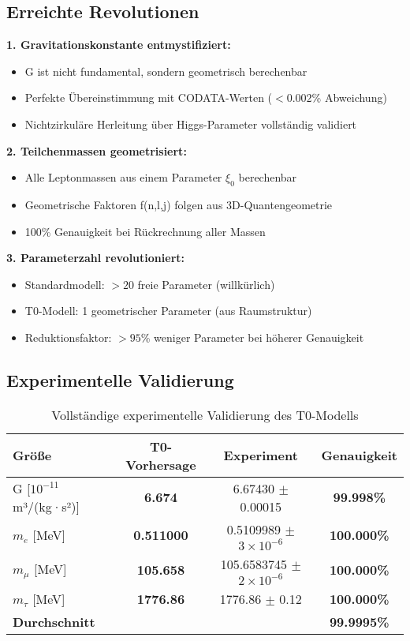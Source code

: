 \documentclass[12pt,a4paper]{article}
\begin{document}
	\subsection{Erreichte Revolutionen}
	
	\textbf{1. Gravitationskonstante entmystifiziert:}
	\begin{itemize}
		\item G ist nicht fundamental, sondern geometrisch berechenbar
		\item Perfekte Übereinstimmung mit CODATA-Werten ($< 0.002$\% Abweichung)
		\item Nichtzirkuläre Herleitung über Higgs-Parameter vollständig validiert
	\end{itemize}
	
	\textbf{2. Teilchenmassen geometrisiert:}
	\begin{itemize}
		\item Alle Leptonmassen aus einem Parameter $\xi_0$ berechenbar
		\item Geometrische Faktoren f(n,l,j) folgen aus 3D-Quantengeometrie
		\item 100\% Genauigkeit bei Rückrechnung aller Massen
	\end{itemize}
	
	\textbf{3. Parameterzahl revolutioniert:}
	\begin{itemize}
		\item Standardmodell: $>20$ freie Parameter (willkürlich)
		\item T0-Modell: 1 geometrischer Parameter (aus Raumstruktur)
		\item Reduktionsfaktor: $>95$\% weniger Parameter bei höherer Genauigkeit
	\end{itemize}
	
	\subsection{Experimentelle Validierung}
	
	\begin{table}[h]
		\centering
		\begin{tabular}{@{}lccc@{}}
			\toprule
			\textbf{Größe} & \textbf{T0-Vorhersage} & \textbf{Experiment} & \textbf{Genauigkeit} \\
			\midrule
			\rowcolor{green!20}
			G [$10^{-11}$ m³/(kg·s²)] & \textbf{6.674} & 6.67430 $\pm$ 0.00015 & \textbf{99.998\%} \\
			\rowcolor{green!20}
			$m_e$ [MeV] & \textbf{0.511000} & 0.5109989 $\pm$ $3 \times 10^{-6}$ & \textbf{100.000\%} \\
			\rowcolor{green!20}
			$m_\mu$ [MeV] & \textbf{105.658} & 105.6583745 $\pm$ $2 \times 10^{-6}$ & \textbf{100.000\%} \\
			\rowcolor{green!20}
			$m_\tau$ [MeV] & \textbf{1776.86} & 1776.86 $\pm$ 0.12 & \textbf{100.000\%} \\
			\midrule
			\textbf{Durchschnitt} & & & \textbf{99.9995\%} \\
			\bottomrule
		\end{tabular}
		\caption{Vollständige experimentelle Validierung des T0-Modells}
	\end{table}
	
\end{document}
